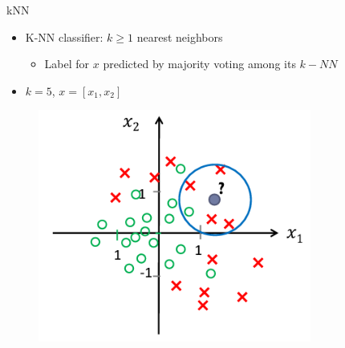 \documentclass[serif, aspectratio=169]{beamer}
\begin{document}
\begin{frame}{kNN}
    \begin{minipage}{0.5\textwidth}
        \begin{itemize}
            \item K-NN classifier: $k \geq 1$ nearest neighbors
            \begin{itemize}
                \item Label for $x$ predicted by majority voting among its $k-NN$
            \end{itemize}
            \item $k=5$, $x=[x_1, x_2]$
        \end{itemize}
    \end{minipage} %
    \begin{minipage}{0.45\textwidth}
        \begin{figure}[h]
        \centering
        \includegraphics[width=0.8\textwidth]{pic/kE5.png}
        \end{figure}
    \end{minipage}
\end{frame}
\end{document}
